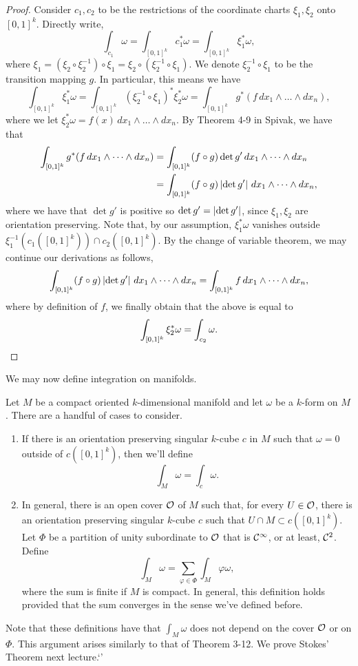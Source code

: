 \begin{proof}
    Consider $c_1, c_2$ to be the restrictions of the coordinate charts $\xi_1, \xi_2$ onto $[0, 1]^k$. Directly write,
    \[ \int_{c_1} \omega = \int_{[0, 1]^k} c_1^\ast \omega = \int_{[0, 1]^k} \xi_1^\ast \omega, \]
    where $\xi_1 = (\xi_2 \circ \xi_2^{-1}) \circ \xi_1 = \xi_2 \circ (\xi_2^{-1} \circ \xi_1)$. We denote $\xi_2^{-1} \circ \xi_1$ to be the transition mapping $g$. In particular, this means we have
    \[ \int_{[0, 1]^k} \xi_1^\ast \omega = \int_{[0, 1]^k} (\xi_2^{-1} \circ \xi_1)^\ast \xi_2^\ast \omega = \int_{[0, 1]^k} g^\ast (f \, dx_1 \wedge \dots \wedge dx_n), \]
    where we let $\xi_2^\ast \omega = f(x) \, dx_1 \wedge \dots \wedge dx_n$. By Theorem 4-9 in Spivak, we have that
    \begin{align*}
        \int_{[0, 1]^k} g^\ast (f \, dx_1 \wedge \dots \wedge dx_n) &= \int_{[0, 1]^k} (f \circ g) \det g' \, dx_1 \wedge \dots \wedge dx_n \\
        &= \int_{[0, 1]^k} (f \circ g) \left\lvert \det g' \right\rvert \, dx_1 \wedge \dots \wedge dx_n,
    \end{align*}
    where we have that $\det g'$ is positive so $\det g' = \left\lvert \det g' \right\rvert$, since $\xi_1, \xi_2$ are orientation preserving. Note that, by our assumption, $\xi_1^\ast \omega$ vanishes outside $\xi_1^{-1}(c_1([0, 1]^k)) \cap c_2([0, 1]^k)$. By the change of variable theorem, we may continue our derivations as follows,
    \[ \int_{[0, 1]^k} (f \circ g) \left\lvert \det g' \right\rvert \, dx_1 \wedge \dots \wedge dx_n = \int_{[0, 1]^k} f \, dx_1 \wedge \dots \wedge dx_n, \]
    where by definition of $f$, we finally obtain that the above is equal to
    \[ \int_{[0, 1]^k} \xi_2^\ast \omega = \int_{c_2} \omega. \qedhere \]
\end{proof}
\noindent We may now define integration on manifolds.
\begin{definition}
    Let $M$ be a compact oriented $k$-dimensional manifold and let $\omega$ be a $k$-form on $M$. There are a handful of cases to consider.
    \begin{enumerate}[label=(\roman*)]
        \item If there is an orientation preserving singular $k$-cube $c$ in $M$ such that $\omega = 0$ outside of $c([0, 1]^k)$, then we'll define
        \[ \int_M \omega = \int_c \omega. \]
        \item In general, there is an open cover $\mathcal O$ of $M$ such that, for every $U \in \mathcal O$, there is an orientation preserving singular $k$-cube $c$ such that $U \cap M \subset c([0, 1]^k)$. Let $\Phi$ be a partition of unity subordinate to $\mathcal O$ that is $\mathcal C^\infty$, or at least, $\mathcal C^2$. Define
        \[ \int_M \omega = \sum_{\varphi \in \Phi} \int_M \varphi \omega, \]
        where the sum is finite if $M$ is compact. In general, this definition holds provided that the sum converges in the sense we've defined before.
    \end{enumerate}
\end{definition}
\noindent Note that these definitions have that $\int_M \omega$ does not depend on the cover $\mathcal O$ or on $\Phi$. This argument arises similarly to that of Theorem 3-12. We prove Stokes' Theorem next lecture.`'
